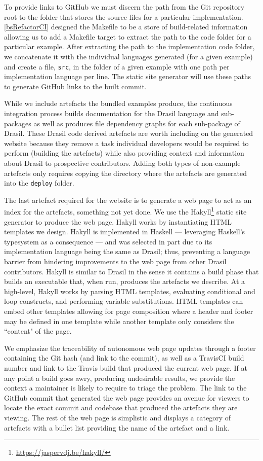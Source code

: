 {{{{{To provide links to GitHub we must discern the path from the Git repository root to the folder that stores the source files for a particular implementation. \autoref{bsRefactorCI} designed the Makefile to be a store of build-related information allowing us to add a Makefile target to extract the path to the code folder for a particular example. After extracting the path to the implementation code folder, we concatenate it with the individual languages generated (for a given example) and create a file, \texttt{src}, in the folder of a given example with one path per implementation language per line. The static site generator will use these paths to generate GitHub links to the built commit. 

While we include artefacts the bundled examples produce, the continuous integration process builds documentation for the Drasil language and sub-packages as well as produces file dependency graphs for each sub-package of Drasil. These Drasil code derived artefacts are worth including on the generated website because they remove a task individual developers would be required to perform (building the artefacts) while also providing context and information about Drasil to prospective contributors. Adding both types of non-example artefacts only requires copying the directory where the artefacts are generated into the \texttt{deploy} folder.

The last artefact required for the website is to generate a web page to act as an index for the artefacts, something not yet done. We use the Hakyll\footnote{\url{https://jaspervdj.be/hakyll/}} static site generator to produce the web page. Hakyll works by instantiating HTML templates we design. Hakyll is implemented in Haskell --- leveraging Haskell's typesystem as a consequence --- and was selected in part due to its implementation language being the same as Drasil; thus, preventing a language barrier from hindering improvements to the web page from other Drasil contributors. Hakyll is similar to Drasil in the sense it contains a build phase that builds an executable that, when run, produces the artefacts we describe. At a high-level, Hakyll works by parsing HTML templates, evaluating conditional and loop constructs, and performing variable substitutions. HTML templates can embed other templates allowing for page composition where a header and footer may be defined in one template while another template only considers the ``content" of the page. 

We emphasize the traceability of autonomous web page updates through a footer containing the Git hash (and link to the commit), as well as a TravisCI build number and link to the Travis build that produced the current web page. If at any point a build goes awry, producing undesirable results, we provide the context a maintainer is likely to require to triage the problem. The link to the GitHub commit that generated the web page provides an avenue for viewers to locate the exact commit and codebase that produced the artefacts they are viewing. The rest of the web page is simplistic and displays a category of artefacts with a bullet list providing the name of the artefact and a link.

}}}}}
